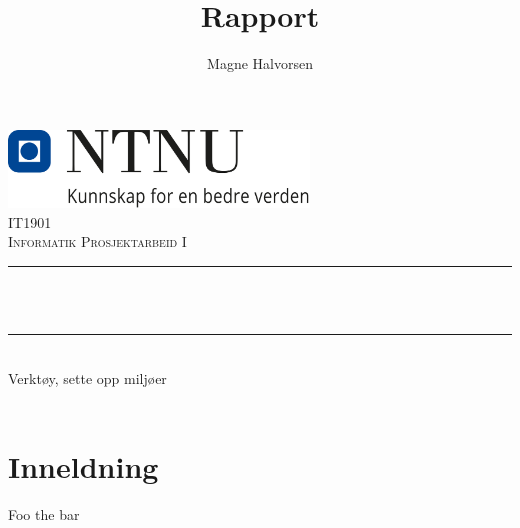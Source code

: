 \documentclass[12pt,a4paper]{article}
\title{Rapport}
\author{Magne Halvorsen}
\def \fagkode{IT1901}
\def \fagtittel{Informatik Prosjektarbeid I}
\def \tema{Verktøy, sette opp miljøer}
\begin{document}
\makeatletter
\begin{titlepage}
    \begin{center}
    \includegraphics[width=0.60\textwidth]{NTNU_logo.png}\\[1cm]
    \textsc{\Large \fagkode}\\[0.5cm]
    \textsc{\large \fagtittel}\\[0.5cm]

    \rule{\linewidth}{0.5mm} \\[0.4cm]
    { \huge \bfseries \@title \\[0.4cm] }
    \rule{\linewidth}{0.5mm} \\[1.5cm]

    \Large
    \tema\\[1cm]

    \vfill
    \large
    \@author\\[0.4cm]

    \large
    \@date
    \end{center}
\end{titlepage}
\makeatother

\section*{Inneldning}

\newpage
\begin{thebibliography}{1}

        Foo the bar

\end{thebibliography}
\end{document}

